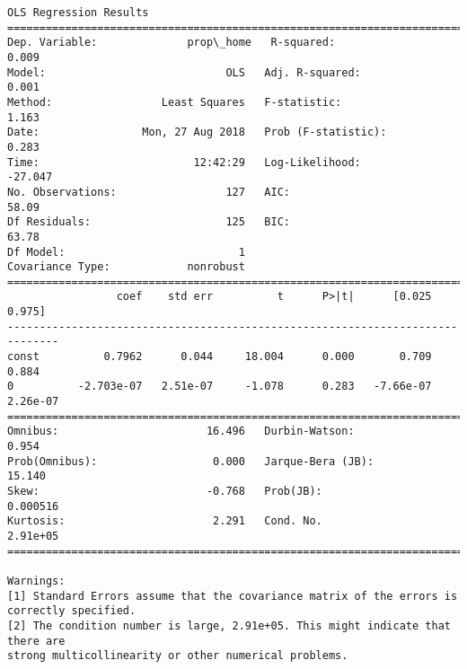 \documentclass[11pt]{article}
\begin{document}
    \begin{Verbatim}[commandchars=\\\{\}]
                            OLS Regression Results                            
==============================================================================
Dep. Variable:              prop\_home   R-squared:                       0.009
Model:                            OLS   Adj. R-squared:                  0.001
Method:                 Least Squares   F-statistic:                     1.163
Date:                Mon, 27 Aug 2018   Prob (F-statistic):              0.283
Time:                        12:42:29   Log-Likelihood:                -27.047
No. Observations:                 127   AIC:                             58.09
Df Residuals:                     125   BIC:                             63.78
Df Model:                           1                                         
Covariance Type:            nonrobust                                         
==============================================================================
                 coef    std err          t      P>|t|      [0.025      0.975]
------------------------------------------------------------------------------
const          0.7962      0.044     18.004      0.000       0.709       0.884
0          -2.703e-07   2.51e-07     -1.078      0.283   -7.66e-07    2.26e-07
==============================================================================
Omnibus:                       16.496   Durbin-Watson:                   0.954
Prob(Omnibus):                  0.000   Jarque-Bera (JB):               15.140
Skew:                          -0.768   Prob(JB):                     0.000516
Kurtosis:                       2.291   Cond. No.                     2.91e+05
==============================================================================

Warnings:
[1] Standard Errors assume that the covariance matrix of the errors is correctly specified.
[2] The condition number is large, 2.91e+05. This might indicate that there are
strong multicollinearity or other numerical problems.

    \end{Verbatim}
\end{document}
